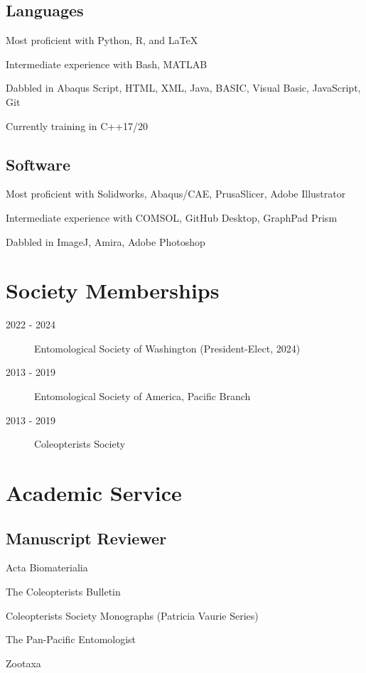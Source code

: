 \documentclass[12pt,a4paper]{article}
\begin{document}
	\subsection*{Languages}
		\begin{description}
			\item Most proficient with Python, R, and \LaTeX
			\item Intermediate experience with Bash, MATLAB
			\item Dabbled in Abaqus Script, HTML, XML, Java, BASIC, Visual Basic, JavaScript, Git
			\item Currently training in C++17/20
		\end{description}
		
	\subsection*{Software}
		\begin{description}
			\item Most proficient with Solidworks, Abaqus/CAE, PrusaSlicer, Adobe Illustrator
			\item Intermediate experience with COMSOL, GitHub Desktop, GraphPad Prism
			\item Dabbled in ImageJ, Amira, Adobe Photoshop
		\end{description}


\section*{Society Memberships}
	\begin{description}
		\item [2022 - 2024]	Entomological Society of Washington (President-Elect, 2024)
		\item [2013 - 2019] Entomological Society of America, Pacific Branch
		\item [2013 - 2019] Coleopterists Society
	\end{description}

\section*{Academic Service}
	\subsection*{Manuscript Reviewer}
		\begin{description}
			\item Acta Biomaterialia
			\item The Coleopterists Bulletin
			\item Coleopterists Society Monographs (Patricia Vaurie Series)
			\item The Pan-Pacific Entomologist 
			\item Zootaxa
		\end{description}
\end{document}
